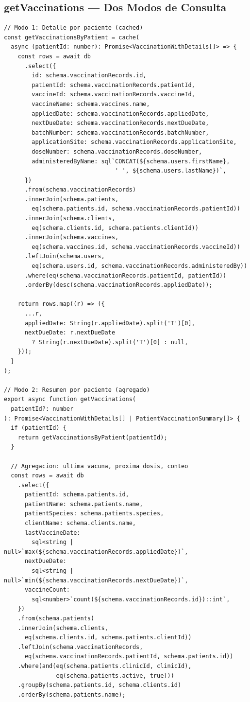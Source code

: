 \subsection{getVaccinations --- Dos Modos de Consulta}

\begin{lstlisting}[style=typescript, caption=Vacunacion - Dos modos de consulta]
// Modo 1: Detalle por paciente (cached)
const getVaccinationsByPatient = cache(
  async (patientId: number): Promise<VaccinationWithDetails[]> => {
    const rows = await db
      .select({
        id: schema.vaccinationRecords.id,
        patientId: schema.vaccinationRecords.patientId,
        vaccineId: schema.vaccinationRecords.vaccineId,
        vaccineName: schema.vaccines.name,
        appliedDate: schema.vaccinationRecords.appliedDate,
        nextDueDate: schema.vaccinationRecords.nextDueDate,
        batchNumber: schema.vaccinationRecords.batchNumber,
        applicationSite: schema.vaccinationRecords.applicationSite,
        doseNumber: schema.vaccinationRecords.doseNumber,
        administeredByName: sql`CONCAT(${schema.users.firstName},
                                ' ', ${schema.users.lastName})`,
      })
      .from(schema.vaccinationRecords)
      .innerJoin(schema.patients,
        eq(schema.patients.id, schema.vaccinationRecords.patientId))
      .innerJoin(schema.clients,
        eq(schema.clients.id, schema.patients.clientId))
      .innerJoin(schema.vaccines,
        eq(schema.vaccines.id, schema.vaccinationRecords.vaccineId))
      .leftJoin(schema.users,
        eq(schema.users.id, schema.vaccinationRecords.administeredBy))
      .where(eq(schema.vaccinationRecords.patientId, patientId))
      .orderBy(desc(schema.vaccinationRecords.appliedDate));

    return rows.map((r) => ({
      ...r,
      appliedDate: String(r.appliedDate).split('T')[0],
      nextDueDate: r.nextDueDate
        ? String(r.nextDueDate).split('T')[0] : null,
    }));
  }
);

// Modo 2: Resumen por paciente (agregado)
export async function getVaccinations(
  patientId?: number
): Promise<VaccinationWithDetails[] | PatientVaccinationSummary[]> {
  if (patientId) {
    return getVaccinationsByPatient(patientId);
  }

  // Agregacion: ultima vacuna, proxima dosis, conteo
  const rows = await db
    .select({
      patientId: schema.patients.id,
      patientName: schema.patients.name,
      patientSpecies: schema.patients.species,
      clientName: schema.clients.name,
      lastVaccineDate:
        sql<string | null>`max(${schema.vaccinationRecords.appliedDate})`,
      nextDueDate:
        sql<string | null>`min(${schema.vaccinationRecords.nextDueDate})`,
      vaccineCount:
        sql<number>`count(${schema.vaccinationRecords.id})::int`,
    })
    .from(schema.patients)
    .innerJoin(schema.clients,
      eq(schema.clients.id, schema.patients.clientId))
    .leftJoin(schema.vaccinationRecords,
      eq(schema.vaccinationRecords.patientId, schema.patients.id))
    .where(and(eq(schema.patients.clinicId, clinicId),
               eq(schema.patients.active, true)))
    .groupBy(schema.patients.id, schema.clients.id)
    .orderBy(schema.patients.name);


\end{lstlisting}
